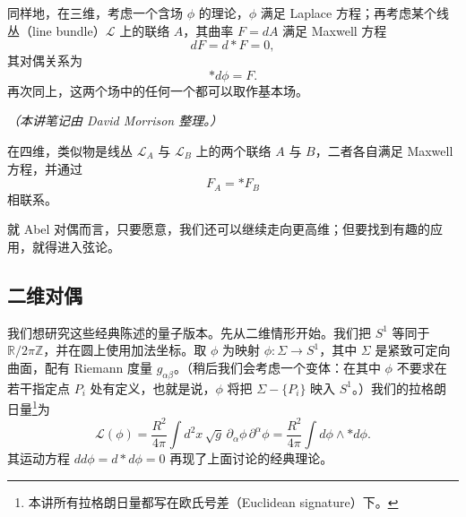 
同样地，在三维，考虑一个含场 $\phi$ 的理论，$\phi$ 满足 Laplace 方程；再考虑某个线丛（line bundle）$\mathcal{L}$ 上的联络 $A$，其曲率 $F=dA$ 满足 Maxwell 方程
\begin{equation}
  \tag{8.3}
  \label{eq:8-3}
  dF=d\ast F=0,
\end{equation}
其对偶关系为
\begin{equation}
  \tag{8.4}
  \label{eq:8-4}
  \ast d\phi=F.
\end{equation}
再次同上，这两个场中的任何一个都可以取作基本场。


\noindent\textit{（本讲笔记由 David Morrison 整理。）}

在四维，类似物是线丛 $\mathcal{L}_A$ 与 $\mathcal{L}_B$ 上的两个联络 $A$ 与 $B$，二者各自满足 Maxwell 方程，并通过
\begin{equation}
  \tag{8.5}
  \label{eq:8-5}
  F_A=\ast F_B
\end{equation}
相联系。

就 Abel 对偶而言，只要愿意，我们还可以继续走向更高维；但要找到有趣的应用，就得进入弦论。

\subsection{二维对偶}

我们想研究这些经典陈述的量子版本。先从二维情形开始。我们把 $S^1$ 等同于 $\mathbb{R}/2\pi\mathbb{Z}$，并在圆上使用加法坐标。取 $\phi$ 为映射 $\phi:\Sigma\to S^1$，其中 $\Sigma$ 是紧致可定向曲面，配有 Riemann 度量 $g_{\alpha\beta}$。（稍后我们会考虑一个变体：在其中 $\phi$ 不要求在若干指定点 $P_i$ 处有定义，也就是说，$\phi$ 将把 $\Sigma-\{P_i\}$ 映入 $S^1$。）我们的拉格朗日量\footnote{本讲所有拉格朗日量都写在欧氏号差（Euclidean signature）下。}为
\begin{equation}
  \tag{8.6}
  \label{eq:8-6}
  \mathcal{L}(\phi)=\frac{R^2}{4\pi}\int d^2x\,\sqrt{g}\,\partial_\alpha\phi\,\partial^\alpha\phi
  =\frac{R^2}{4\pi}\int d\phi\wedge\ast d\phi .
\end{equation}
其运动方程 $dd\phi=d\ast d\phi=0$ 再现了上面讨论的经典理论。

